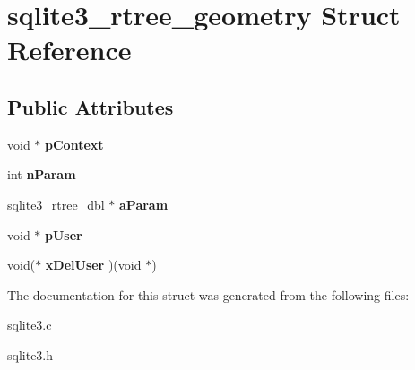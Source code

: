 \hypertarget{structsqlite3__rtree__geometry}{}\section{sqlite3\+\_\+rtree\+\_\+geometry Struct Reference}
\label{structsqlite3__rtree__geometry}
\subsection*{Public Attributes}
\begin{DoxyCompactItemize}
\item 
void $\ast$ {\bfseries p\+Context}\hypertarget{structsqlite3__rtree__geometry_a33f98691626846c1317419654d5c5f51}{}\label{structsqlite3__rtree__geometry_a33f98691626846c1317419654d5c5f51}

\item 
int {\bfseries n\+Param}\hypertarget{structsqlite3__rtree__geometry_ada7b9eba82660e3321dd4c93526697c9}{}\label{structsqlite3__rtree__geometry_ada7b9eba82660e3321dd4c93526697c9}

\item 
sqlite3\+\_\+rtree\+\_\+dbl $\ast$ {\bfseries a\+Param}\hypertarget{structsqlite3__rtree__geometry_a42eafbc0dcb02ed32a0a4b10ff887416}{}\label{structsqlite3__rtree__geometry_a42eafbc0dcb02ed32a0a4b10ff887416}

\item 
void $\ast$ {\bfseries p\+User}\hypertarget{structsqlite3__rtree__geometry_a6fdedfd741cf5055f9562298cd32dc74}{}\label{structsqlite3__rtree__geometry_a6fdedfd741cf5055f9562298cd32dc74}

\item 
void($\ast$ {\bfseries x\+Del\+User} )(void $\ast$)\hypertarget{structsqlite3__rtree__geometry_afa1ed10f488b306df354efe56efdf287}{}\label{structsqlite3__rtree__geometry_afa1ed10f488b306df354efe56efdf287}

\end{DoxyCompactItemize}


The documentation for this struct was generated from the following files\+:\begin{DoxyCompactItemize}
\item 
sqlite3.\+c\item 
sqlite3.\+h\end{DoxyCompactItemize}
